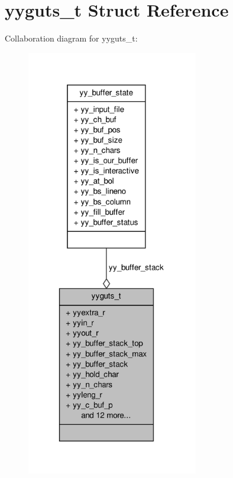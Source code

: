 \hypertarget{structyyguts__t}{\section{yyguts\-\_\-t \-Struct \-Reference}
\label{structyyguts__t}
}


\-Collaboration diagram for yyguts\-\_\-t\-:
\nopagebreak
\begin{figure}[H]
\begin{center}
\leavevmode
\includegraphics[width=212pt]{structyyguts__t__coll__graph}
\end{center}
\end{figure}
